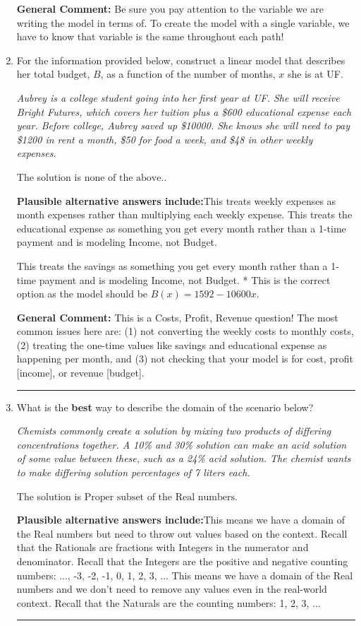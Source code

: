\documentclass{extbook}[14pt]
\newcommand{\litem}[1]{\item #1

\rule{\textwidth}{0.4pt}}
\begin{document}
\begin{enumerate}
{\textbf{General Comment:} Be sure you pay attention to the variable we are writing the model in terms of. To create the model with a single variable, we have to know that variable is the same throughout each path!
}
\litem{
For the information provided below, construct a linear model that describes her total budget, $B$, as a function of the number of months, $x$ she is at UF.

\begin{center}
    \textit{ Aubrey is a college student going into her first year at UF. She will receive Bright Futures, which covers her tuition plus a \$600 educational expense each year. Before college, Aubrey saved up \$10000. She knows she will need to pay \$1200 in rent a month, \$50 for food a week, and \$48 in other weekly expenses. }
\end{center}
The solution is \( \text{none of the above.} \).\begin{enumerate}[label=\Alph*.]
\textbf{Plausible alternative answers include:}This treats weekly expenses as month expenses rather than multiplying each weekly expense.
This treats the educational expense as something you get every month rather than a 1-time payment and is modeling Income, not Budget.

This treats the savings as something you get every month rather than a 1-time payment and is modeling Income, not Budget.
* This is the correct option as the model should be $B(x) = 1592 - 10600 x$.
\end{enumerate}

\textbf{General Comment:} This is a Costs, Profit, Revenue question! The most common issues here are: (1) not converting the weekly costs to monthly costs, (2) treating the one-time values like savings and educational expense as happening per month, and (3) not checking that your model is for cost, profit [income], or revenue [budget].
}
\litem{
What is the \textbf{best} way to describe the domain of the scenario below?

\begin{center}
    \textit{ Chemists commonly create a solution by mixing two products of differing concentrations together. A 10\% and 30\% solution can make an acid solution of some value between these, such as a 24\% acid solution. The chemist wants to make differing solution percentages of 7 liters each. }
\end{center}
The solution is \( \text{Proper subset of the Real numbers} \).\begin{enumerate}[label=\Alph*.]
\textbf{Plausible alternative answers include:}This means we have a domain of the Real numbers but need to throw out values based on the context.
Recall that the Rationals are fractions with Integers in the numerator and denominator.
Recall that the Integers are the positive and negative counting numbers: ..., -3, -2, -1, 0, 1, 2, 3, ... 
This means we have a domain of the Real numbers and we don't need to remove any values even in the real-world context.
Recall that the Naturals are the counting numbers: 1, 2, 3, ...
\end{enumerate}

}
\end{enumerate}
\end{document}
